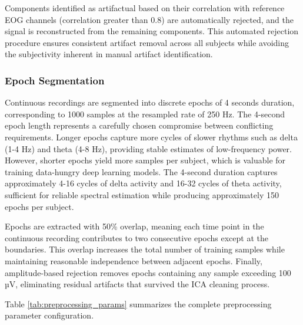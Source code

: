 Components identified as artifactual based on their correlation with reference EOG channels (correlation greater than 0.8) are automatically rejected, and the signal is reconstructed from the remaining components. This automated rejection procedure ensures consistent artifact removal across all subjects while avoiding the subjectivity inherent in manual artifact identification.

\subsubsection{Epoch Segmentation}

Continuous recordings are segmented into discrete epochs of 4 seconds duration, corresponding to 1000 samples at the resampled rate of 250 Hz. The 4-second epoch length represents a carefully chosen compromise between conflicting requirements. Longer epochs capture more cycles of slower rhythms such as delta (1-4 Hz) and theta (4-8 Hz), providing stable estimates of low-frequency power. However, shorter epochs yield more samples per subject, which is valuable for training data-hungry deep learning models. The 4-second duration captures approximately 4-16 cycles of delta activity and 16-32 cycles of theta activity, sufficient for reliable spectral estimation while producing approximately 150 epochs per subject.

Epochs are extracted with 50\% overlap, meaning each time point in the continuous recording contributes to two consecutive epochs except at the boundaries. This overlap increases the total number of training samples while maintaining reasonable independence between adjacent epochs. Finally, amplitude-based rejection removes epochs containing any sample exceeding 100 µV, eliminating residual artifacts that survived the ICA cleaning process.

Table \ref{tab:preprocessing_params} summarizes the complete preprocessing parameter configuration.

